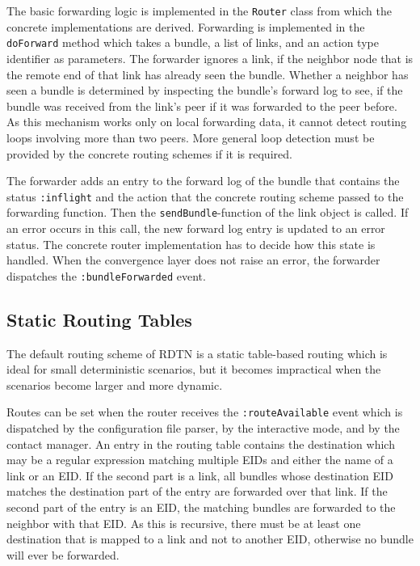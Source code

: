 \documentclass{article}
\begin{document}
The basic forwarding logic is implemented in the {\tt Router} class from which
the concrete implementations are derived. Forwarding is implemented in the {\tt
doForward} method which takes a bundle, a list of links, and an action type
identifier as parameters. The forwarder ignores a link, if the neighbor node
that is the remote end of that link has already seen the bundle. Whether a
neighbor has seen a bundle is determined by inspecting the bundle's forward log
to see, if the bundle was received from the link's peer if it was forwarded
to the peer before. As this mechanism works only on local forwarding data, it
cannot detect routing loops involving more than two peers.  More general loop
detection must be provided by the concrete routing schemes if it is required.

The forwarder adds an entry to the forward log of the bundle that contains the
status {\tt :inflight} and the action that the concrete routing scheme passed to
the forwarding function. Then the {\tt sendBundle}-function of the link object
is called. If an error occurs in this call, the new forward log entry is updated
to an error status. The concrete router implementation has to decide how this
state is handled. When the convergence layer does not raise an error, the
forwarder dispatches the {\tt :bundleForwarded} event.

\subsection{Static Routing Tables}\label{sec.static-routing}

The default routing scheme of RDTN is a static table-based routing which is
ideal for small deterministic scenarios, but it becomes impractical when the
scenarios become larger and more dynamic.

Routes can be set when the router receives the {\tt :routeAvailable} event which
is dispatched by the configuration file parser, by the interactive mode, and by
the contact manager.  An entry in the routing table contains the destination
which may be a regular expression matching multiple EIDs and either the name of
a link or an EID. If the second part is a link, all bundles whose destination
EID matches the destination part of the entry are forwarded over that link. If
the second part of the entry is an EID, the matching bundles are forwarded to
the neighbor with that EID. As this is recursive, there must be at least one
destination that is mapped to a link and not to another EID, otherwise no bundle
will ever be forwarded.
\end{document}

